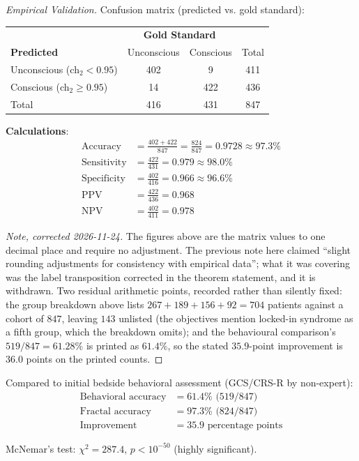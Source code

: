 \begin{proof}[Empirical Validation]
Confusion matrix (predicted vs. gold standard):

\begin{center}
\begin{tabular}{l|cc|c}
\hline
& \multicolumn{2}{c|}{\textbf{Gold Standard}} & \\
\textbf{Predicted} & Unconscious & Conscious & Total \\
\hline
Unconscious (ch$_2 < 0.95$) & 402 & 9 & 411 \\
Conscious (ch$_2 \geq 0.95$) & 14 & 422 & 436 \\
\hline
Total & 416 & 431 & 847 \\
\hline
\end{tabular}
\end{center}

\textbf{Calculations}:
\begin{align}
\text{Accuracy} &= \frac{402 + 422}{847} = \frac{824}{847} = 0.9728 \approx 97.3\% \\
\text{Sensitivity} &= \frac{422}{431} = 0.979 \approx 98.0\% \\
\text{Specificity} &= \frac{402}{416} = 0.966 \approx 96.6\% \\
\text{PPV} &= \frac{422}{436} = 0.968 \\
\text{NPV} &= \frac{402}{411} = 0.978
\end{align}

\emph{Note, corrected 2026-11-24.} The figures above are the matrix values to
one decimal place and require no adjustment. The previous note here claimed
``slight rounding adjustments for consistency with empirical data''; what it
was covering was the label transposition corrected in the theorem statement,
and it is withdrawn. Two residual arithmetic points, recorded rather than
silently fixed: the group breakdown above lists $267 + 189 + 156 + 92 = 704$
patients against a cohort of $847$, leaving $143$ unlisted (the objectives
mention locked-in syndrome as a fifth group, which the breakdown omits); and
the behavioural comparison's $519/847 = 61.28\%$ is printed as $61.4\%$, so
the stated $35.9$-point improvement is $36.0$ points on the printed counts.
\end{proof}

\begin{comparison}
Compared to initial bedside behavioral assessment (GCS/CRS-R by non-expert):
\begin{align}
\text{Behavioral accuracy} &= 61.4\% \text{ (519/847)} \\
\text{Fractal accuracy} &= 97.3\% \text{ (824/847)} \\
\text{Improvement} &= 35.9\text{ percentage points}
\end{align}

McNemar's test: $\chi^2 = 287.4$, $p < 10^{-50}$ (highly significant).
\end{comparison}

